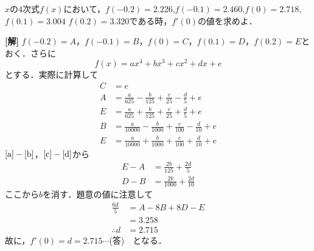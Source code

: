 \documentclass[a4j]{jarticle}
\title{}
\begin{document}

\begin{oframed}
$x$の$4$次式$f(x)$において，$f(-0.2)=2.226$,$f(-0.1)=2.460$,$f(0)=2.718$,$f(0.1)=3.004$
$f(0.2)=3.320$である時，$f'(0)$の値を求めよ．
\end{oframed}

\setlength{\columnseprule}{0.4pt}
\begin{multicols}{2}
{\bf[解]} $f(-0.2)=A$，$f(-0.1)=B$，$f(0)=C$，$f(0.1)=D$，$f(0.2)=E$とおく．さらに
\[f(x)=ax^4+bx^3+cx^2+dx+e \]
とする．実際に計算して
\begin{align}
C&=e \\
A&=\frac{a}{625}-\frac{b}{125}+\frac{c}{25}-\frac{d}{5}+e \label{a}\\
E&=\frac{a}{625}+\frac{b}{125}+\frac{c}{25}+\frac{d}{5}+e \label{b}\\
B&=\frac{a}{10000}-\frac{b}{1000}+\frac{c}{100}-\frac{d}{10}+e\label{c} \\
E&=\frac{a}{10000}+\frac{b}{1000}+\frac{c}{100}+\frac{d}{10}+e\label{d} 
\end{align}
$\eqref{a}-\eqref{b}$，$\eqref{c}-\eqref{d}$から
\begin{align*}
E-A&=\frac{2b}{125}+\frac{2d}{5} \\
D-B&=\frac{2b}{1000}+\frac{2d}{10}
\end{align*}
ここから$b$を消す．題意の値に注意して
\begin{align*}
\frac{6d}{5}&=A-8B+8D-E \\
&=3.258 \\
\therefore d&=2.715
\end{align*}
故に，$f'(0)=d=2.715\cdots$(答)　となる．
\newpage
\end{multicols}
\end{document}
